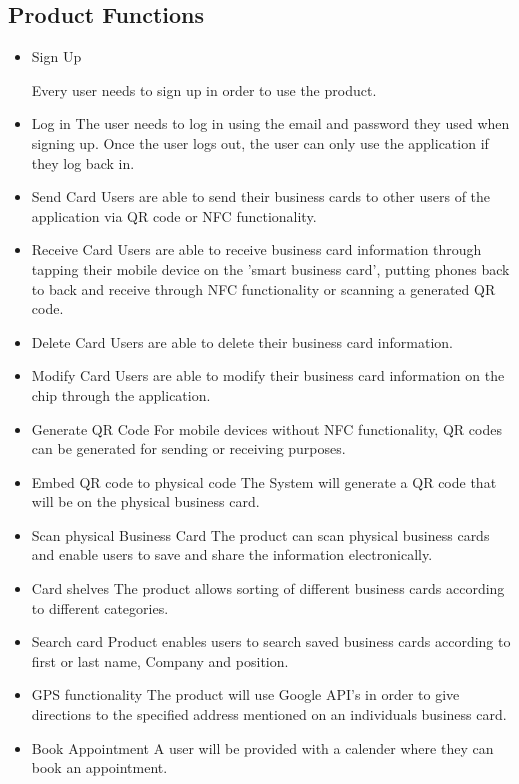 \documentclass[english]{article}
\begin{document}
				\subsection{Product Functions}
				\begin{itemize} 
					\item Sign Up
					
					\subitem
					Every user needs to sign up in order to use the product.
					\item
					Log in
					\subitem
					The user needs to log in using the email and password they used when signing up.
					\subitem 
					Once the user logs out, the user can only use the application if they log back in.
					\item 
					Send Card
					\subitem
					Users are able to send their business cards to other users of the application via QR code or NFC 						functionality.
					\item
					Receive Card
					\subitem
					Users are able to receive business card information through tapping their mobile device on the 						'smart business card', putting phones back to back and receive through NFC functionality or 							scanning a generated QR code.
					\item 
					Delete Card
					\subitem
					Users are able to delete their business card information.
					\item
					Modify Card
					\subitem
					Users are able to modify their business card information on the chip through the application.
					\item
					Generate QR Code
					\subitem
					For mobile devices without NFC functionality, QR codes can be generated for sending or receiving 						purposes.
					\item
					Embed QR code to physical code
					\subitem
					The System will generate a QR code that will be on the physical business card.
					\item
					Scan physical Business Card
					\subitem
					The product can scan physical business cards and enable users to save and share the information 						electronically.
					\item
					Card shelves
					\subitem
					The product allows sorting of different business cards according to different categories.
					
					\item
					Search card
					\subitem
					Product enables users to search saved business cards according to first or last name, Company and 					position.
					\item
					GPS functionality	
					\subitem
					The product will use Google API's in order to give directions to the specified address mentioned on 						an individuals business card.
					\item
					Book Appointment
					\subitem
					A user will be provided with a calender where they can book an appointment.
				\end{itemize}
\end{document}
